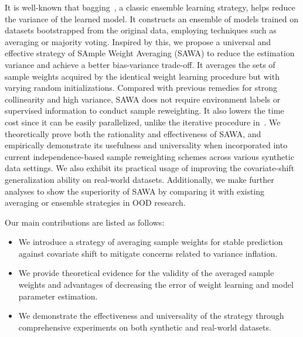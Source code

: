 It is well-known that bagging~\citep{breiman1996bagging}, a classic ensemble learning strategy, helps reduce the variance of the learned model. It constructs an ensemble of models trained on datasets bootstrapped from the original data, employing techniques such as averaging or majority voting. 
Inspired by this, we propose a universal and effective strategy of SAmple Weight Averaging (SAWA) to reduce the estimation variance and achieve a better bias-variance trade-off. 
It averages the sets of sample weights acquired by the identical weight learning procedure but with varying random initializations. 
Compared with previous remedies for strong collinearity and high variance, SAWA does not require environment labels or supervised information to conduct sample reweighting. It also lowers the time cost since it can be easily parallelized, unlike the iterative procedure in~\citet{yu2023stable}. 
We theoretically prove both the rationality and effectiveness of SAWA, and empirically demonstrate its usefulness and universality when incorporated into current independence-based sample reweighting schemes across various synthetic data settings. We also exhibit its practical usage of improving the covariate-shift generalization ability on real-world datasets. Additionally, we make further analyses to show the superiority of SAWA by comparing it with existing averaging or ensemble strategies in OOD research. 


Our main contributions are listed as follows:
\begin{itemize}
    \item We introduce a strategy of averaging sample weights for stable prediction against covariate shift to mitigate concerns related to variance inflation.
    \item We provide theoretical evidence for the validity of the averaged sample weights and advantages of decreasing the error of weight learning and model parameter estimation. 
    \item We demonstrate the effectiveness and universality of the strategy through comprehensive experiments on both synthetic and real-world datasets.
\end{itemize}

